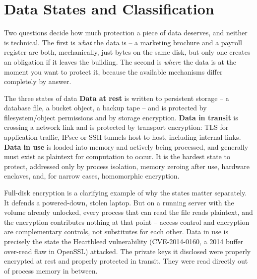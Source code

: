 \section{Data States and Classification}

Two questions decide how much protection a piece of data deserves, and neither is technical. The
first is \emph{what} the data is -- a marketing brochure and a payroll register are both, mechanically,
just bytes on the same disk, but only one creates an obligation if it leaves the building. The
second is \emph{where} the data is at the moment you want to protect it, because the available
mechanisms differ completely by answer.

\begin{definition}{The three states of data}
\textbf{Data at rest} is written to persistent storage -- a database file, a bucket object, a backup
tape -- and is protected by filesystem/object permissions and by storage encryption. \textbf{Data in
transit} is crossing a network link and is protected by transport encryption: TLS for application
traffic, IPsec or SSH tunnels host-to-host, including internal links. \textbf{Data in use} is loaded
into memory and actively being processed, and generally must exist as plaintext for computation to
occur. It is the hardest state to protect, addressed only by process isolation, memory zeroing after
use, hardware enclaves, and, for narrow cases, homomorphic encryption.
\end{definition}

Full-disk encryption is a clarifying example of why the states matter separately. It defends a
powered-down, stolen laptop. But on a running server with the volume already unlocked, every
process that can read the file reads plaintext, and the encryption contributes nothing at that
point -- access control and encryption are complementary controls, not substitutes for each other.
Data in use is precisely the state the Heartbleed vulnerability (CVE-2014-0160, a 2014 buffer
over-read flaw in OpenSSL) attacked. The private keys it disclosed were properly
encrypted at rest and properly protected in transit. They were read directly out of process memory
in between.

